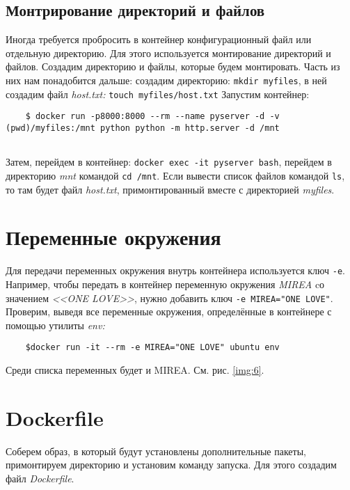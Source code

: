 \documentclass[a4paper,14pt]{extarticle}
\begin{document}
\subsection{Монтрирование директорий и файлов}

Иногда требуется пробросить в контейнер конфигурационный файл или отдельную директорию. Для
этого используется монтирование директорий и файлов.
Создадим директорию и файлы, которые будем монтировать. Часть из них нам понадобится дальше:
создадим директорию: \texttt{mkdir myfiles}, в ней создадим файл \textit{host.txt:} \texttt{touch myfiles/host.txt}
Запустим контейнер:
\begin{lstlisting}
	$ docker run -p8000:8000 --rm --name pyserver -d -v (pwd)/myfiles:/mnt python python -m http.server -d /mnt
	

\end{lstlisting} 
	Затем, перейдем в контейнер: \texttt{docker exec -it pyserver bash}, перейдем в директорию \textit{mnt} командой
\texttt{cd /mnt}. Если вывести список файлов командой \texttt{ls}, то там будет файл \textit{host.txt}, примонтированный
вместе с директорией \textit{myfiles}.


\section{Переменные окружения}
Для передачи переменных окружения внутрь контейнера используется ключ \texttt{-e}. Например, чтобы
передать в контейнер переменную окружения \textit{MIREA} cо значением \textit{<<ONE LOVE>>}, нужно добавить
ключ \texttt{-e MIREA="ONE LOVE"}.
Проверим, выведя все переменные окружения, определённые в контейнере с помощью утилиты \textit{env:}
\begin{lstlisting}
	$docker run -it --rm -e MIREA="ONE LOVE" ubuntu env
\end{lstlisting}
Среди списка переменных будет и MIREA. См. рис. \ref{img:6}.

\section{Dockerfile}

Соберем образ, в который будут установлены дополнительные пакеты, примонтируем директорию и установим команду запуска. Для этого создадим файл \textit{Dockerfile}.
\end{document}
